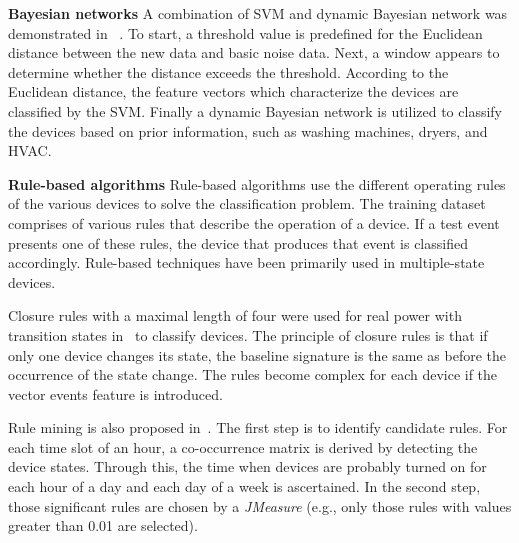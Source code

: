 %



\textbf{Bayesian networks}
A combination of SVM and dynamic Bayesian network was demonstrated in ~\cite{froehlich2011disaggregated}.
To start, a threshold value is predefined for the Euclidean distance between the new data and
basic noise data. 
Next, a window appears to determine whether the distance
exceeds the threshold. According to the Euclidean distance,
the feature vectors which characterize the devices are classified by the SVM.
Finally a dynamic Bayesian network is utilized to classify the devices based on
prior information, such as washing machines, dryers, and
HVAC.


\textbf{Rule-based algorithms}
Rule-based algorithms use the different operating rules of the various devices to solve the classification problem. 
The training dataset comprises of various rules that describe the operation of a device. If a test event presents one of these rules, the device that produces that event is classified accordingly. Rule-based techniques have been primarily used in multiple-state devices. 

Closure rules with a maximal length of four were used for real power with transition states in~\cite{hampden2012closure} to classify devices.
The principle of closure rules is that
if only one device changes its state,
the baseline signature is the same as before the occurrence of the state
change.
The rules become complex for each device 
if the vector events feature is introduced. 

Rule mining is also proposed in~\cite{rollins2014using}. 
The first step is to identify candidate rules. 
For each time slot of an hour, 
a co-occurrence matrix is derived by detecting the device states. 
Through this, the time when devices are probably turned on for each 
hour of a day and each day of a week is ascertained.
In the second step, those significant rules are chosen by a 
\textit{JMeasure} (e.g., only those rules with values greater than 
0.01 are selected).


